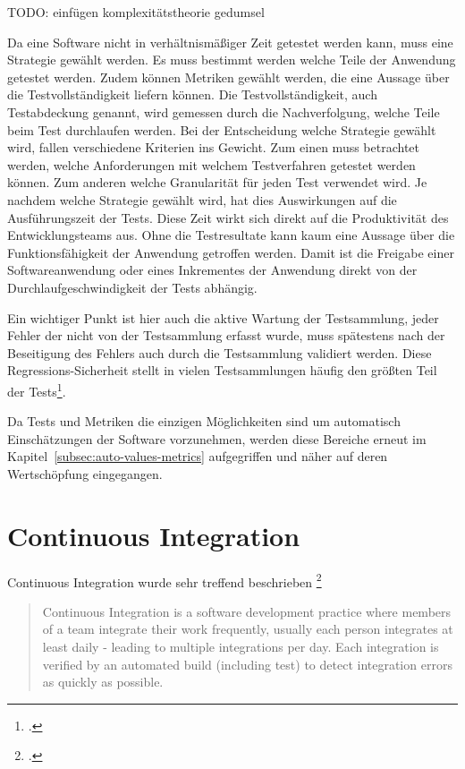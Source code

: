 TODO: einfügen komplexitätstheorie gedumsel

Da eine Software nicht in verhältnismäßiger Zeit getestet werden kann, muss eine Strategie gewählt werden. Es muss 
bestimmt werden welche Teile der Anwendung getestet werden. Zudem können Metriken gewählt werden, die eine Aussage über 
die Testvollständigkeit liefern können. Die Testvollständigkeit, auch Testabdeckung genannt, wird gemessen durch die 
Nachverfolgung, welche Teile beim Test durchlaufen werden. Bei der Entscheidung welche Strategie gewählt wird, fallen 
verschiedene Kriterien ins Gewicht. Zum einen muss betrachtet werden, welche Anforderungen mit welchem Testverfahren 
getestet werden können. Zum anderen welche Granularität für jeden Test verwendet wird.
Je nachdem welche Strategie gewählt wird, hat dies Auswirkungen auf die Ausführungszeit der Tests. Diese Zeit wirkt sich 
direkt auf die Produktivität des Entwicklungsteams aus. Ohne die Testresultate kann kaum eine Aussage über die 
Funktionsfähigkeit der Anwendung getroffen werden. Damit ist die Freigabe einer Softwareanwendung oder eines Inkrementes 
der Anwendung direkt von der Durchlaufgeschwindigkeit der Tests abhängig.

Ein wichtiger Punkt ist hier auch die aktive Wartung der Testsammlung, jeder Fehler der nicht von der Testsammlung 
erfasst wurde, muss spätestens nach der Beseitigung des Fehlers auch durch die Testsammlung validiert werden. Diese 
Regressions-Sicherheit stellt in vielen Testsammlungen häufig den größten Teil der Tests\footcite{software-quality2008}.

Da Tests und Metriken die einzigen Möglichkeiten sind um automatisch Einschätzungen der Software vorzunehmen, werden 
diese Bereiche erneut im Kapitel~\ref{subsec:auto-values-metrics} aufgegriffen und näher auf deren Wertschöpfung 
eingegangen.

\section{Continuous Integration}

Continuous Integration wurde sehr treffend beschrieben \footcite{fowler2006}
\blockquote {Continuous Integration is a software development practice where members of a team integrate their work frequently, usually each person integrates at least daily - leading to multiple integrations per day. Each integration is verified by an automated build (including test) to detect integration errors as quickly as possible.}

